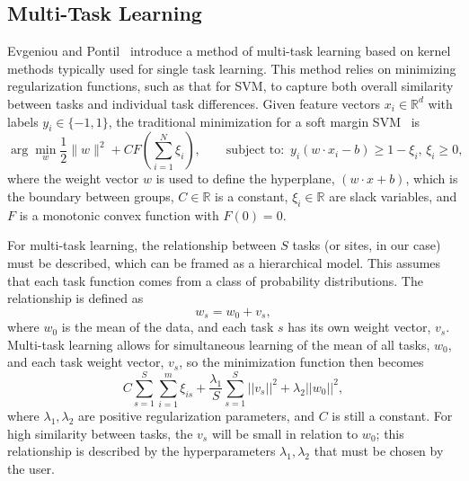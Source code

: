 \documentclass{llncs}
\begin{document}

\subsection{Multi-Task Learning}
\label{subsec:MTL}
Evgeniou and Pontil~\cite{regMTL} introduce a method of multi-task learning
based on kernel methods typically used for single task learning.  This method
relies on minimizing regularization functions, such as that for SVM, to capture
both overall similarity between tasks and individual task differences. Given
feature vectors $x_i \in \mathbb{R}^d$ with labels $y_i \in \{-1, 1\}$, the
traditional minimization for a soft margin SVM~\cite{svm} is
\begin{equation}
\label{eq:svm}
\arg \min_{w} \frac{1}{2}\|w\|^2 + C F\left(\sum_{i=1}^N \xi_i\right),
\quad\quad \text{subject to:}\,\,\, y_i (w \cdot x_i - b) \geq 1 - \xi_i,\,\xi_i
\geq 0,
\end{equation}
where the weight vector $w$ is used to define the hyperplane, $(w \cdot x +b)$,
which is the boundary between groups, $C \in \mathbb{R}$ is a constant, $\xi_i
\in \mathbb{R}$ are slack variables, and $F$ is a monotonic convex function with
$F(0)=0$.

For multi-task learning, the relationship between $S$ tasks (or sites, in our
case) must be described, which can be framed as a hierarchical model. This
assumes that each task function comes from a class of probability distributions.
The relationship is defined as
\begin{equation}
\label{eq:sim}
 w_s = w_0 + v_s ,
\end{equation}
where $w_0$ is the mean of the data, and each task $s$ has its own weight
vector, $v_s$. Multi-task learning allows for simultaneous learning of the mean
of all tasks, $w_0$, and each task weight vector, $v_s$, so the minimization
function then becomes
\begin{equation}
\label{eq:mtlsvm}
 C \sum_{s=1}^S \sum_{i=1}^m \xi_{is} + \frac{\lambda_1}{S} \sum_{s=1}^S ||v_s||^2 + \lambda_2||w_0||^2 ,
\end{equation}
where $\lambda_1, \lambda_2$ are positive regularization parameters, and $C$ is
still a constant. For high similarity between tasks, the $v_s$ will be small in
relation to $w_0$; this relationship is described by the hyperparameters
$\lambda_1, \lambda_2$ that must be chosen by the user.
\end{document}
